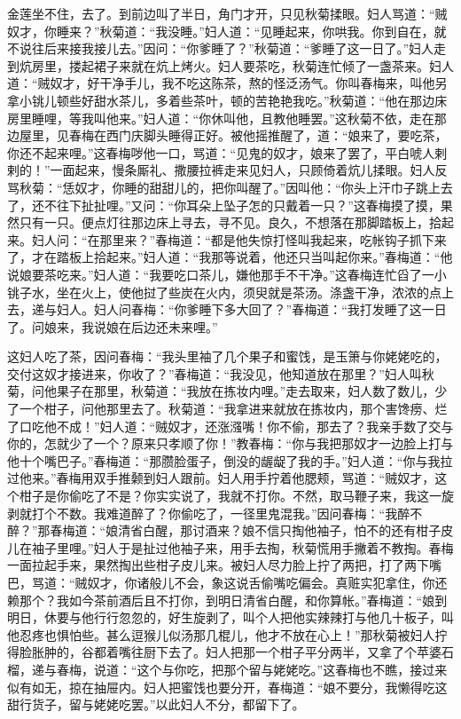 金莲坐不住，去了。到前边叫了半日，角门才开，只见秋菊揉眼。妇人骂道：“贼奴才，你睡来？”秋菊道：“我没睡。”妇人道：“见睡起来，你哄我。你到自在，就不说往后来接我接儿去。”因问：“你爹睡了？”秋菊道：“爹睡了这一日了。”妇人走到炕房里，搂起裙子来就在炕上烤火。妇人要茶吃，秋菊连忙倾了一盏茶来。妇人道：“贼奴才，好干净手儿，我不吃这陈茶，熬的怪泛汤气。你叫春梅来，叫他另拿小铫儿顿些好甜水茶儿，多着些茶叶，顿的苦艳艳我吃。”秋菊道：“他在那边床房里睡哩，等我叫他来。”妇人道：“你休叫他，且教他睡罢。”这秋菊不依，走在那边屋里，见春梅在西门庆脚头睡得正好。被他摇推醒了，道：“娘来了，要吃茶，你还不起来哩。”这春梅哕他一口，骂道：“见鬼的奴才，娘来了罢了，平白唬人剌剌的！”一面起来，慢条厮礼、撒腰拉裤走来见妇人，只顾倚着炕儿揉眼。妇人反骂秋菊：“恁奴才，你睡的甜甜儿的，把你叫醒了。”因叫他：“你头上汗巾子跳上去了，还不往下扯扯哩。”又问：“你耳朵上坠子怎的只戴着一只？”这春梅摸了摸，果然只有一只。便点灯往那边床上寻去，寻不见。良久，不想落在那脚踏板上，拾起来。妇人问：“在那里来？”春梅道：“都是他失惊打怪叫我起来，吃帐钩子抓下来了，才在踏板上拾起来。”妇人道：“我那等说着，他还只当叫起你来。”春梅道：“他说娘要茶吃来。”妇人道：“我要吃口茶儿，嫌他那手不干净。”这春梅连忙舀了一小铫子水，坐在火上，使他挝了些炭在火内，须臾就是茶汤。涤盏干净，浓浓的点上去，递与妇人。妇人问春梅：“你爹睡下多大回了？”春梅道：“我打发睡了这一日了。问娘来，我说娘在后边还未来哩。”

这妇人吃了茶，因问春梅：“我头里袖了几个果子和蜜饯，是玉箫与你姥姥吃的，交付这奴才接进来，你收了？”春梅道：“我没见，他知道放在那里？”妇人叫秋菊，问他果子在那里，秋菊道：“我放在拣妆内哩。”走去取来，妇人数了数儿，少了一个柑子，问他那里去了。秋菊道：“我拿进来就放在拣妆内，那个害馋痨、烂了口吃他不成！”妇人道：“贼奴才，还涨漒嘴！你不偷，那去了？我亲手数了交与你的，怎就少了一个？原来只孝顺了你！”教春梅：“你与我把那奴才一边脸上打与他十个嘴巴子。”春梅道：“那臜脸蛋子，倒没的龌龊了我的手。”妇人道：“你与我拉过他来。”春梅用双手推颡到妇人跟前。妇人用手拧着他腮颊，骂道：“贼奴才，这个柑子是你偷吃了不是？你实实说了，我就不打你。不然，取马鞭子来，我这一旋剥就打个不数。我难道醉了？你偷吃了，一径里鬼混我。”因问春梅：“我醉不醉？”那春梅道：“娘清省白醒，那讨酒来？娘不信只掏他袖子，怕不的还有柑子皮儿在袖子里哩。”妇人于是扯过他袖子来，用手去掏，秋菊慌用手撇着不教掏。春梅一面拉起手来，果然掏出些柑子皮儿来。被妇人尽力脸上拧了两把，打了两下嘴巴，骂道：“贼奴才，你诸般儿不会，象这说舌偷嘴吃偏会。真赃实犯拿住，你还赖那个？我如今茶前酒后且不打你，到明日清省白醒，和你算帐。”春梅道：“娘到明日，休要与他行行忽忽的，好生旋剥了，叫个人把他实辣辣打与他几十板子，叫他忍疼也惧怕些。甚么逗猴儿似汤那几棍儿，他才不放在心上！”那秋菊被妇人拧得脸胀肿的，谷都着嘴往厨下去了。妇人把那一个柑子平分两半，又拿了个苹婆石榴，递与春梅，说道：“这个与你吃，把那个留与姥姥吃。”这春梅也不瞧，接过来似有如无，掠在抽屉内。妇人把蜜饯也要分开，春梅道：“娘不要分，我懒得吃这甜行货子，留与姥姥吃罢。”以此妇人不分，都留下了。

